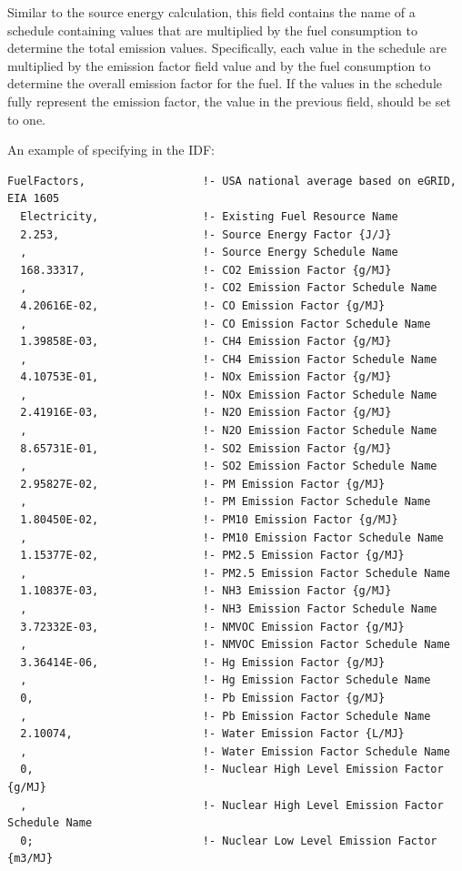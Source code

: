 Similar to the source energy calculation, this field contains the name of a schedule containing values that are multiplied by the fuel consumption to determine the total emission values. Specifically, each value in the schedule are multiplied by the emission factor field value and by the fuel consumption to determine the overall emission factor for the fuel. If the values in the schedule fully represent the emission factor, the value in the previous field, should be set to one.

An example of specifying in the IDF:

\begin{lstlisting}
FuelFactors,                  !- USA national average based on eGRID, EIA 1605
  Electricity,                !- Existing Fuel Resource Name
  2.253,                      !- Source Energy Factor {J/J}
  ,                           !- Source Energy Schedule Name
  168.33317,                  !- CO2 Emission Factor {g/MJ}
  ,                           !- CO2 Emission Factor Schedule Name
  4.20616E-02,                !- CO Emission Factor {g/MJ}
  ,                           !- CO Emission Factor Schedule Name
  1.39858E-03,                !- CH4 Emission Factor {g/MJ}
  ,                           !- CH4 Emission Factor Schedule Name
  4.10753E-01,                !- NOx Emission Factor {g/MJ}
  ,                           !- NOx Emission Factor Schedule Name
  2.41916E-03,                !- N2O Emission Factor {g/MJ}
  ,                           !- N2O Emission Factor Schedule Name
  8.65731E-01,                !- SO2 Emission Factor {g/MJ}
  ,                           !- SO2 Emission Factor Schedule Name
  2.95827E-02,                !- PM Emission Factor {g/MJ}
  ,                           !- PM Emission Factor Schedule Name
  1.80450E-02,                !- PM10 Emission Factor {g/MJ}
  ,                           !- PM10 Emission Factor Schedule Name
  1.15377E-02,                !- PM2.5 Emission Factor {g/MJ}
  ,                           !- PM2.5 Emission Factor Schedule Name
  1.10837E-03,                !- NH3 Emission Factor {g/MJ}
  ,                           !- NH3 Emission Factor Schedule Name
  3.72332E-03,                !- NMVOC Emission Factor {g/MJ}
  ,                           !- NMVOC Emission Factor Schedule Name
  3.36414E-06,                !- Hg Emission Factor {g/MJ}
  ,                           !- Hg Emission Factor Schedule Name
  0,                          !- Pb Emission Factor {g/MJ}
  ,                           !- Pb Emission Factor Schedule Name
  2.10074,                    !- Water Emission Factor {L/MJ}
  ,                           !- Water Emission Factor Schedule Name
  0,                          !- Nuclear High Level Emission Factor {g/MJ}
  ,                           !- Nuclear High Level Emission Factor Schedule Name
  0;                          !- Nuclear Low Level Emission Factor {m3/MJ}
\end{lstlisting}

